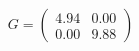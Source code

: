 \documentclass[preview]{standalone}
\begin{document}
\begin{align*}
G = \begin{pmatrix} 4.94 & 0.00 \\ 0.00 & 9.88 \end{pmatrix}
\end{align*}
\end{document}
